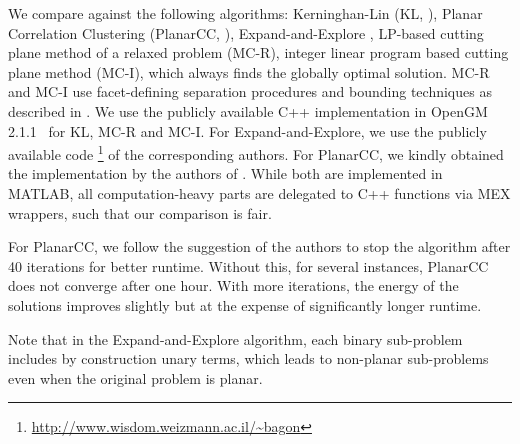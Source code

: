 We compare against the following algorithms:
Kerninghan-Lin (KL, \cite{kerninghan_1970_bell}),
Planar Correlation Clustering (PlanarCC, \cite{yarkony_2012_eccv}),
Expand-and-Explore \cite{bagon_2011_arxiv},
LP-based cutting plane method of a relaxed problem (MC-R),
integer linear program based cutting plane method
(MC-I), which always finds the globally optimal solution.
MC-R and MC-I use facet-defining
separation procedures and bounding techniques as described in
\cite{kappes_2013_arxiv}.
%
We use the publicly available C++ implementation in
OpenGM 2.1.1~\cite{andres_2012_opengm_arxiv}
for KL, MC-R and MC-I.
%
For Expand-and-Explore, we use the publicly available code%
\footnote{\url{http://www.wisdom.weizmann.ac.il/~bagon}}
of the corresponding authors. For PlanarCC, we kindly obtained
the implementation by the authors of \cite{yarkony_2012_eccv}.
%
While both are implemented
in MATLAB, all computation-heavy parts are delegated
to C++ functions via MEX wrappers, such that our comparison is fair.

For PlanarCC,
we follow the suggestion of the authors
to stop the algorithm after 40 iterations for better 
runtime. Without this, for several instances,
PlanarCC does not converge after one hour.
With more iterations, the energy of the solutions improves slightly
but at the expense of significantly longer runtime.

Note that in the Expand-and-Explore algorithm,
each binary sub-problem includes by construction unary terms,
which leads to non-planar sub-problems even when the original
problem is planar.


